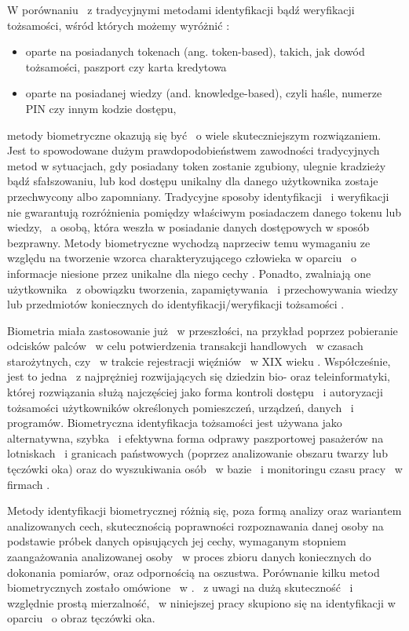 W porównaniu ~z tradycyjnymi metodami identyfikacji bądź weryfikacji tożsamości, wśród których możemy wyróżnić \cite{Jain00}\cite{Jain08}:
\begin{itemize}
\item oparte na posiadanych tokenach (ang. token-based), takich, jak dowód tożsamości, paszport czy karta kredytowa
\item oparte na posiadanej wiedzy (and. knowledge-based), czyli haśle, numerze PIN czy innym kodzie dostępu,
\end{itemize}
metody biometryczne okazują się być ~o wiele skuteczniejszym rozwiązaniem. Jest to spowodowane dużym prawdopodobieństwem zawodności tradycyjnych metod w sytuacjach, gdy posiadany token zostanie zgubiony, ulegnie kradzieży bądź sfałszowaniu, lub kod dostępu unikalny dla danego użytkownika zostaje przechwycony albo zapomniany. Tradycyjne sposoby identyfikacji ~i weryfikacji nie gwarantują rozróżnienia pomiędzy właściwym posiadaczem danego tokenu lub wiedzy, ~a osobą, która weszła w posiadanie danych dostępowych w sposób bezprawny. Metody biometryczne wychodzą naprzeciw temu wymaganiu ze względu na tworzenie wzorca charakteryzującego człowieka w oparciu ~o informacje niesione przez unikalne dla niego cechy \cite{Jain00}. Ponadto, zwalniają one użytkownika ~z obowiązku tworzenia, zapamiętywania ~i przechowywania wiedzy lub przedmiotów koniecznych do identyfikacji/weryfikacji tożsamości \cite{Jain08}.  

Biometria miała zastosowanie już ~w przeszłości, na przykład poprzez pobieranie odcisków palców ~w celu potwierdzenia transakcji handlowych ~w czasach starożytnych, czy ~w trakcie rejestracji więźniów ~w XIX wieku \cite{Bio02}\cite{HF1}. Współcześnie, jest to jedna ~z najprężniej rozwijających się dziedzin bio- oraz teleinformatyki, której rozwiązania służą najczęściej jako forma kontroli dostępu ~i autoryzacji tożsamości użytkowników określonych pomieszczeń, urządzeń, danych ~i programów. Biometryczna identyfikacja tożsamości jest używana jako alternatywna, szybka ~i efektywna forma odprawy paszportowej pasażerów na lotniskach ~i granicach państwowych (poprzez analizowanie obszaru twarzy lub tęczówki oka) oraz do wyszukiwania osób ~w bazie ~i monitoringu czasu pracy ~w firmach \cite{Bio01}\cite{Bio02}.

Metody identyfikacji biometrycznej różnią się, poza formą analizy oraz wariantem analizowanych cech, skutecznością poprawności rozpoznawania danej osoby na podstawie próbek danych opisujących jej cechy, wymaganym stopniem zaangażowania analizowanej osoby ~w proces zbioru danych koniecznych do dokonania pomiarów, oraz odpornością na oszustwa. Porównanie kilku metod biometrycznych zostało omówione ~w \cite{Gl11}. ~z uwagi na dużą skuteczność ~i względnie prostą mierzalność, ~w niniejszej pracy skupiono się na identyfikacji w oparciu ~o obraz tęczówki oka.


